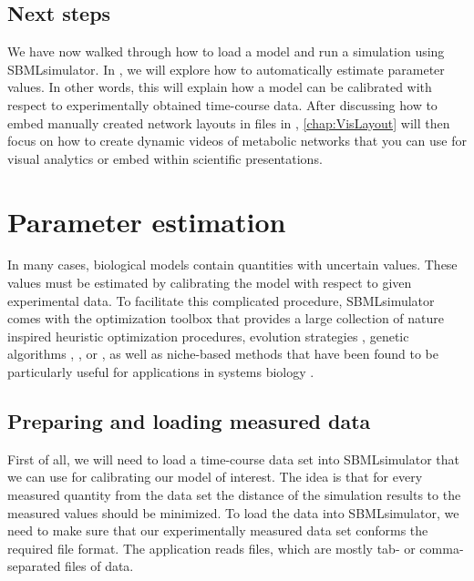 \section{Next steps}

We have now walked through how to load a model and run a simulation using SBMLsimulator.
In , we will explore how to automatically estimate parameter values.
In other words, this will explain how a model can be calibrated with respect to experimentally obtained time-course data.
After discussing how to embed manually created network layouts in \SBML files in , \cref{chap:VisLayout} will then focus on how to create dynamic videos of metabolic networks that you can use for visual analytics or embed within scientific presentations.



\chapter{Parameter estimation}
\label{chap:ParameterEstimation}

In many cases, biological models contain quantities with uncertain values.
These values must be estimated by calibrating the model with respect to given experimental data.
To facilitate this complicated procedure, SBMLsimulator comes with the optimization toolbox \EvA that provides a large collection of nature inspired heuristic optimization procedures, \eg evolution strategies \citep{Rechenberg1973,
Schwefel1975}, genetic algorithms \citep{Holland1975}, \DE \citep{Storn96Usage}, or \PSO \citep{ClercKennedy02, Clerc2005}, as well as niche-based methods that have been found to be particularly useful for applications in systems biology \citep{Kron09NichingGCB}.


\section{Preparing and loading measured data}
\label{ch:prepare}

First of all, we will need to load a time-course data set into SBMLsimulator that we can use for calibrating our model of interest.
The idea is that for every measured quantity from the data set the distance of the simulation results to the measured values should be minimized.
To load the data into SBMLsimulator, we need to make sure that our experimentally measured data set conforms the required file format.
The application reads \CSV files, which are mostly tab- or comma-separated files of data.

